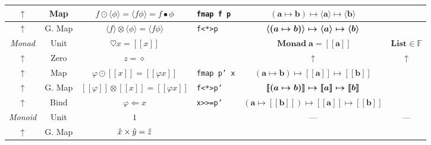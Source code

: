 \documentclass{jsarticle}
\def\[{[\![}
\def\]{]\!]}
\newcommand{\boldsym}[1]{{\boldsymbol{#1}}}
\newcommand{\htypename}[1]{\mathbf{#1}}
\newcommand{\htypeclassname}[1]{\mathbb{#1}}
\begin{document}
\begin{center}
\begin{tabular}{||c|c||c|l|c|c||}
    \hline
$\uparrow$
    &Map
    &$f\odot\langle\phi\rangle=\langle f\phi\rangle=f\bullet\phi$
    &\texttt{fmap f p}
    &$(\htypename{a}\mapsto\htypename{b})\mapsto\boldsym{\langle a\rangle}\mapsto\boldsym{\langle b\rangle}$
    &\\
    \hline
$\uparrow$
    &G. Map
    &$\langle f\rangle\otimes\langle\phi\rangle=\langle f\phi\rangle$
    &\texttt{f<*>p}
    &$\boldsym{\langle}(\boldmath{a}\mapsto\boldmath{b})\boldsym{\rangle}\mapsto\boldsym{\langle a\rangle}\mapsto\boldsym{\langle b\rangle}$
    &\\
    \hline
    \hline
\textsl{Monad}
    &Unit
    &$\heartsuit x=\[x\]$
    &
    &$\mathop{\textbf{Monad}}\htypename{a}=\boldsym{\[a\]}$
    &$\textbf{List}\in\htypeclassname{F}$\\
    \hline
$\uparrow$
    &Zero
    &$z=\diamond$
    &
    &$\uparrow$
    &$\uparrow$\\
    \hline
$\uparrow$
    &Map
    &$\varphi\odot\[x\]=\[\varphi x\]$
    &\texttt{fmap p' x}
    &$(\htypename{a}\mapsto\htypename{b})\mapsto\boldsym{\[a\]}\mapsto\boldsym{\[b\]}$
    &\\
    \hline
$\uparrow$
    &G. Map
    &$\[\varphi\]\otimes\[x\]=\[\varphi x\]$
    &\texttt{f<*>p'}
    &$\boldsym{\[}(\boldmath{a}\mapsto\boldmath{b})\boldsym{\]}\mapsto\boldsym{\[a\]}\mapsto\boldsym{\[b\]}$
    &\\
    \hline
$\uparrow$
    &Bind
    &$\varphi\Leftarrow x$
    &\texttt{x>>=p'}
    &$(\htypename{a}\mapsto\boldsym{\[b\]})\mapsto\boldsym{\[a\]}\mapsto\boldsym{\[b\]}$
    &\\
    \hline
    \hline
\textsl{Monoid}
    &Unit
    &$1$
    &
    &---
    &---\\
    \hline
$\uparrow$
    &G. Map
    &$\Hat{x}\times\Hat{y}=\Hat{z}$
    &
    &
    &\\
    \hline
\end{tabular}
\end{center}
\end{document}
